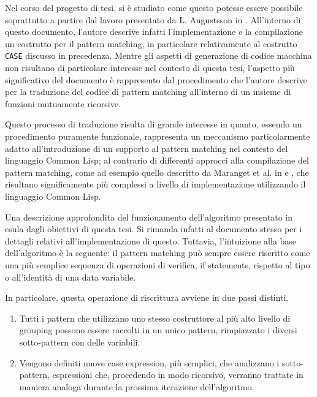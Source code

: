 Nel corso del progetto di tesi, si è studiato come questo potesse essere
possibile soprattutto a partire dal lavoro presentato da L. Augustsson in
\cite{DBLP:conf/fpca/Augustsson85}. All'interno di questo documento, l'autore
descrive infatti l'implementazione e la compilazione un costrutto per il pattern
matching, in particolare relativamente al costrutto \texttt{CASE} discusso in
precedenza. Mentre gli aspetti di generazione di codice macchina non risultano
di particolare interesse nel contesto di questa tesi, l'aspetto più
significativo del documento è rappresento dal procedimento che l'autore descrive
per la traduzione del codice di pattern matching all'interno di un insieme di
funzioni mutuamente ricorsive.

Questo processo di traduzione risulta di grande interesse in quanto, essendo un
procedimento puramente funzionale, rappresenta un meccanismo particolarmente
adatto all'introduzione di un supporto al pattern matching nel contesto del
linguaggio Common Lisp; al contrario di differenti approcci alla compilazione
del pattern matching, come ad esempio quello descritto da Maranget et al. in
\cite{DBLP:conf/icfp/FessantM01} e \cite{DBLP:conf/lfp/Maranget92}, che
risultano significamente più complessi a livello di implementazione utilizzando
il linguaggio Common Lisp.

Una descrizione approfondita del funzionamento dell'algoritmo presentato in
\cite{DBLP:conf/fpca/Augustsson85} esula dagli obiettivi di questa tesi. Si
rimanda infatti al documento stesso per i dettagli relativi all'implementazione
di questo. Tuttavia, l'intuizione alla base dell'algoritmo è la seguente: il
pattern matching può sempre essere riscritto come una più semplice sequenza di
operazioni di verifica, if statements, rispetto al tipo o all'identità di una
data variabile.

In particolare, questa operazione di riscrittura avviene in due passi distinti.

\begin{enumerate}

\item Tutti i pattern che utilizzano uno stesso costruttore al più alto livello
di grouping possono essere raccolti in un unico pattern, rimpiazzato i diversi
sotto-pattern con delle variabili.

\item Vengono definiti nuove case expression, più semplici, che analizzano i
sotto-pattern, espressioni che, procedendo in modo ricorsivo, verranno trattate
in maniera analoga durante la prossima iterazione dell'algoritmo.

\end{enumerate}

